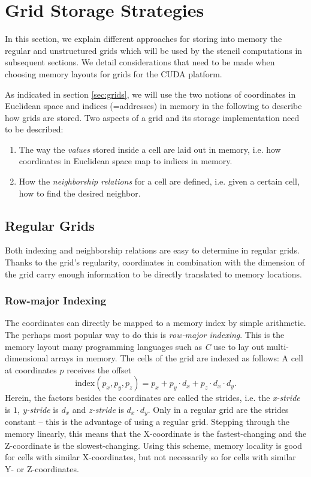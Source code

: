 \chapter{Grid Storage Strategies}                \label{sec:grid-implementations}

In this section, we explain different approaches for storing into memory the regular and unstructured grids which will be used by the stencil computations in subsequent sections. We detail considerations that need to be made when choosing memory layouts for grids for the CUDA platform.

As indicated in section \ref{sec:grids}, we will use the two notions of coordinates in Euclidean space and indices (=addresses) in memory in the following to describe how grids are stored. Two aspects of a grid and its storage implementation need to be described:
\begin{enumerate}
    \item The way the \emph{values} stored inside a cell are laid out in memory, i.e. how coordinates in Euclidean space map to indices in memory.
    \item How the \emph{neighborship relations} for a cell are defined, i.e. given a certain cell, how to find the desired neighbor.
\end{enumerate}

\section{Regular Grids}

Both indexing and neighborship relations are easy to determine in regular grids. Thanks to the grid's regularity, coordinates in combination with the dimension of the grid carry enough information to be directly translated to memory locations.

\subsection{Row-major Indexing}

The coordinates can directly be mapped to a memory index by simple arithmetic. The perhaps most popular way to do this is \emph{row-major indexing}. This is the memory layout many programming languages such as \emph{C} use to lay out multi-dimensional arrays in memory. The cells of the grid are indexed as follows: A cell at coordinates $p$ receives the offset
 $$\text{index}\left(p_x, p_y, p_z\right) = p_x + p_y \cdot d_x + p_z \cdot d_x \cdot d_y.$$
Herein, the factors besides the coordinates are called the strides, i.e. the \emph{x-stride} is $1$, \emph{y-stride} is $d_x$ and \emph{z-stride} is $d_x\cdot d_y$. Only in a regular grid are the strides constant -- this is the advantage of using a regular grid. Stepping through the memory linearly, this means that the X-coordinate is the fastest-changing and the Z-coordinate is the slowest-changing. Using this scheme, memory locality is good for cells with similar X-coordinates, but not necessarily so for cells with similar Y- or Z-coordinates.

